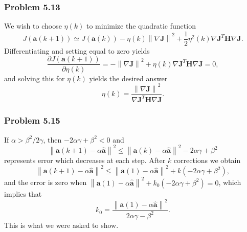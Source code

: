 \documentclass[12pt, a4paper]{article}
\newcommand{\vect}[1]{\bm{#1}}
\newcommand{\norm}[1]{\left\lVert#1\right\rVert}
\begin{document}
\subsubsection*{Problem 5.13}
We wish to choose $\eta(k)$ to minimize the quadratic function
\begin{equation*}
	J \left( \vect{a}(k+1)  \right)
	\simeq
	J \left( \vect{a}(k)  \right)
	-
	\eta(k) \norm{\nabla \vect{J}}^2
	+
	\frac{1}{2} \eta^2(k) \nabla \vect{J}^T \vect{H} \nabla \vect{J}.
\end{equation*}
Differentiating and setting equal to zero yields
\begin{equation*}
	\frac{\partial J \left( \vect{a}(k+1)  \right)}{\partial \eta(k)}
	=
	-
	\norm{\nabla \vect{J}}^2
	+
	\eta(k) \nabla \vect{J}^T \vect{H} \nabla \vect{J} = 0,
\end{equation*}
and solving this for $\eta(k)$ yields the desired answer
\begin{equation*}
	\eta(k) = \frac{\norm{\nabla \vect{J}}^2}{\nabla \vect{J}^T \vect{H} \nabla \vect{J}}.
\end{equation*}

\subsubsection*{Problem 5.15}
If $\alpha > \beta^2 / 2 \gamma$, then $-2 \alpha \gamma +\beta^2 < 0$ and 
\begin{equation*}
	\norm{\vect{a}(k+1) - \alpha \hat{\vect{a}}}^2 
	\leq
	\norm{\vect{a}(k) - \alpha \hat{\vect{a}}}^2 - 2 \alpha \gamma +\beta^2
\end{equation*}
represents error which decreases at each step.
After $k$ corrections we obtain
\begin{equation*}
\norm{\vect{a}(k+1) - \alpha \hat{\vect{a}}}^2 
\leq
\norm{\vect{a}(1) - \alpha \hat{\vect{a}}}^2 + k(-2 \alpha \gamma +\beta^2),
\end{equation*}
and the error is zero when $\norm{\vect{a}(1) - \alpha \hat{\vect{a}}}^2 + k_0(-2 \alpha \gamma +\beta^2) = 0$, which implies that
\begin{equation*}
	k_0 = \frac{\norm{\vect{a}(1) - \alpha \hat{\vect{a}}}^2}{2 \alpha \gamma - \beta^2}.
\end{equation*}
This is what we were asked to show.
\end{document}

